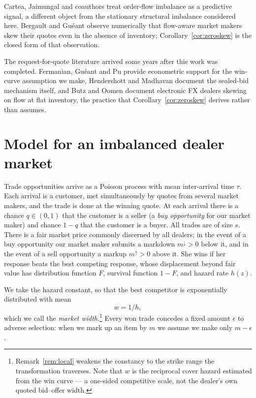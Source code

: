 \documentclass[11pt]{article}
\begin{document}
Cartea, Jaimungal and coauthors \cite{cjr2014,cj2016,cjp2015} treat order-flow imbalance as a predictive signal, a different object from the stationary structural imbalance considered here. Bergault and Gu\'eant \cite{bergaultgueant2023} observe numerically that flow-aware market makers skew their quotes even in the absence of inventory; Corollary~\ref{cor:zeroskew} is the closed form of that observation.

The request-for-quote literature \cite{fgp2017,gueantmanziuk2019,barzykin2023} arrived some years after this work was completed. Fermanian, Gu\'eant and Pu \cite{fgp2017} provide econometric support for the win-curve assumption we make, Hendershott and Madhavan \cite{hendershott2015} document the sealed-bid mechanism itself, and Butz and Oomen \cite{butzoomen2019} document electronic FX dealers skewing on flow at flat inventory, the practice that Corollary~\ref{cor:zeroskew} derives rather than assumes.

\section{Model for an imbalanced dealer market}\label{sec:model}

Trade opportunities arrive as a Poisson process with mean inter-arrival time $\tau$. Each arrival is a customer, met simultaneously by quotes from several market makers, and the trade is done at the winning quote. At each arrival there is a chance $q \in (0,1)$ that the customer is a seller (a \emph{buy opportunity} for our market maker) and chance $1-q$ that the customer is a buyer. All trades are of size $s$. There is a fair market price commonly discerned by all dealers; in the event of a buy opportunity our market maker submits a markdown $m^{\downarrow} > 0$ below it, and in the event of a sell opportunity a markup $m^{\uparrow} > 0$ above it. She wins if her response beats the best competing response, whose displacement beyond fair value has distribution function $F$, survival function $1 - F$, and hazard rate $h(z)$.

We take the hazard constant, so that the best competitor is exponentially distributed with mean
\[
w = 1/h ,
\]
which we call the \emph{market width}.\footnote{Remark~\ref{rem:local} weakens the constancy to the strike range the transformation traverses. Note that $w$ is the reciprocal cover hazard estimated from the win curve --- a one-sided competitive scale, not the dealer's own quoted bid--offer width.} Every won trade concedes a fixed amount $\epsilon$ to adverse selection: when we mark up an item by $m$ we assume we make only $m - \epsilon$.
\end{document}
